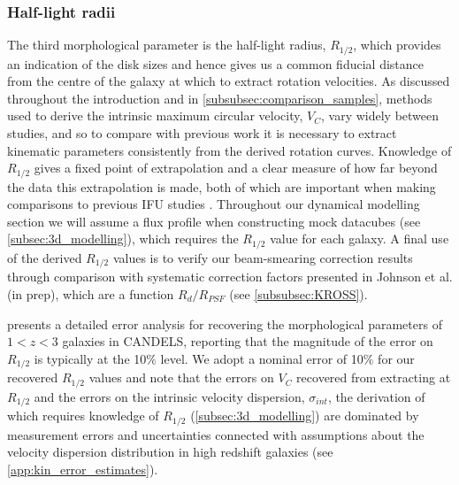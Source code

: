 \documentclass[fleqn,usenatbib]{mn2e}
\begin{document}
\subsubsection{Half-light radii}\label{subsubsection:half-light_radii}
The third morphological parameter is the half-light radius, $R_{1/2}$, which provides an indication of the disk sizes and hence gives us a common fiducial distance from the centre of the galaxy at which to extract rotation velocities.
As discussed throughout the introduction and in \cref{subsubsec:comparison_samples}, methods used to derive the intrinsic maximum circular velocity, $V_{C}$, vary widely between studies, and so to compare with previous work it is necessary to extract kinematic parameters consistently from the derived rotation curves.
Knowledge of $R_{1/2}$ gives a fixed point of extrapolation and a clear measure of how far beyond the data this extrapolation is made, both of which are important when making comparisons to previous IFU studies \citep[e.g.][]{ForsterSchreiber2009,Epinat2012,Wisnioski2015,Stott2016,Harrison2017,Swinbank2017}.
Throughout our dynamical modelling section we will assume a flux profile when constructing mock datacubes (see \cref{subsec:3d_modelling}), which requires the $R_{1/2}$ value for each galaxy.
A final use of the derived $R_{1/2}$ values is to verify our beam-smearing correction results through comparison with systematic correction factors presented in Johnson et al. (in prep), which are a function $R_{d} / R_{PSF}$ (see \cref{subsubsec:KROSS}).

\cite{Bruce2012} presents a detailed error analysis for recovering the morphological parameters of $1 < z < 3$ galaxies in CANDELS, reporting that the magnitude of the error on $R_{1/2}$ is typically at the 10$\%$ level.
We adopt a nominal error of 10$\%$ for our recovered $R_{1/2}$ values and note that the errors on $V_{C}$ recovered from extracting at $R_{1/2}$ and the errors on the intrinsic velocity dispersion, $\sigma_{int}$, the derivation of which requires knowledge of $R_{1/2}$ (\cref{subsec:3d_modelling}) are dominated by measurement errors and uncertainties connected with assumptions about the velocity dispersion distribution in high redshift galaxies (see \cref{app:kin_error_estimates}).
\end{document}
